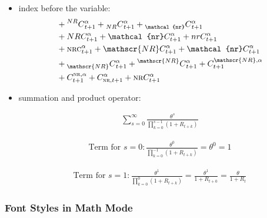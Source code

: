 \documentclass[../thesis.tex]{subfiles}
\begin{document}
\begin{itemize}
	\item index before the variable:
	\begin{align*}
		& + \prescript{NR}{}{C}^{\alpha}_{t+1} + \prescript{}{NR}{C}^{\alpha}_{t+1} + \prescript{}{\mathcal{nr}}{C}^{\alpha}_{t+1}        
		\\
		& + NRC^{\alpha}_{t+1} + \mathcal{nr}C^{\alpha}_{t+1} + nrC^{\alpha}_{t+1}
		\\
		& + \textsc{nrc}^{\alpha}_{t+1} + \mathscr{NR}C^{\alpha}_{t+1} + \mathcal{nr}C^{\alpha}_{t+1}
		\\
		& + \prescript{}{\mathscr{NR}}{C}^{\alpha}_{t+1} + \prescript{\mathscr{NR}}{}{C}^{\alpha}_{t+1} + {C}^{\mathscr{NR},\alpha}_{t+1} 
		\\
		& + {C}^{\textsc{nr},\alpha}_{t+1} + {C}^{\alpha}_{\textsc{nr},t+1} + \textsc{nr}C^{\alpha}_{t+1}
	\end{align*}
	
	\item summation and product operator:
	
	\begin{align*}
		\sum_{s=0}^{\infty} \frac{\theta^s}{\prod_{k=0}^{s-1} (1+R_{t+k})}
	\end{align*}
	
	\begin{align*}
		\text{Term for } s = 0: \frac{\theta^0}{\prod_{k=0}^{-1} (1+R_{t+k})} = \theta^0 = 1
	\end{align*}
	
	\begin{align*}
		\text{Term for } s = 1: \frac{\theta^1}{\prod_{k=0}^{0} (1+R_{t+k})} = \frac{\theta^1}{1+R_{t+0}} = \frac{\theta}{1+R_t}
	\end{align*}
	
\end{itemize}

\newpage

\subsubsection*{Font Styles in Math Mode}
\end{document}
